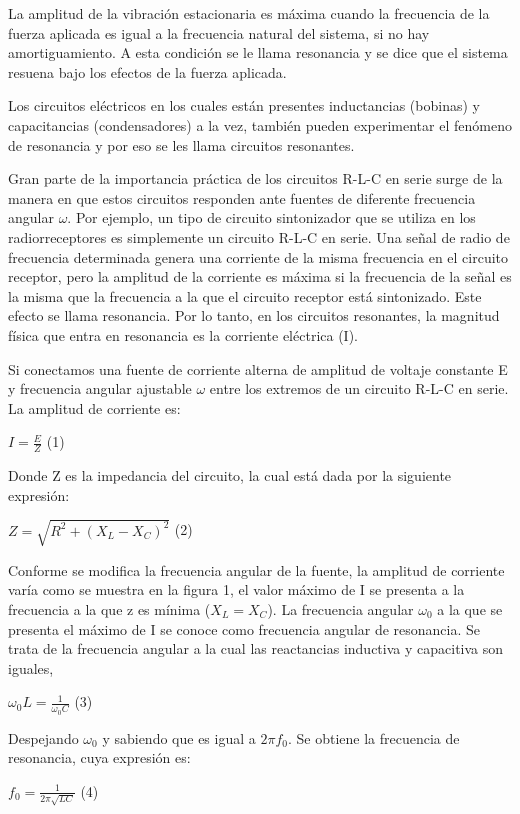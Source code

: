 \documentclass[11pt,a4paper]{article}
\begin{document}
La amplitud de la vibración estacionaria es máxima cuando la frecuencia de la fuerza aplicada es igual a la frecuencia natural del sistema, si no hay amortiguamiento. A esta condición se le llama resonancia y se dice que el sistema resuena bajo los efectos de la fuerza aplicada.

Los circuitos eléctricos en los cuales están presentes inductancias (bobinas) y capacitancias (condensadores) a la vez, también pueden experimentar el fenómeno de resonancia y por eso se les llama circuitos resonantes.

Gran parte de la importancia práctica de los circuitos R-L-C en serie surge de la manera en que estos circuitos responden ante fuentes de diferente frecuencia angular $\omega$. Por ejemplo, un tipo de circuito sintonizador que se utiliza en los radiorreceptores es simplemente un circuito R-L-C en serie. Una señal de radio de frecuencia determinada genera una corriente de la misma frecuencia en el circuito receptor, pero la amplitud de la corriente es máxima si la frecuencia de la señal es la misma que la frecuencia a la que el circuito receptor está sintonizado. Este efecto se llama resonancia. Por lo tanto, en los circuitos resonantes, la magnitud física que entra en resonancia es la corriente eléctrica (I).

Si conectamos una fuente de corriente alterna de amplitud de voltaje constante E y frecuencia angular ajustable $\omega$ entre los extremos de un circuito R-L-C en serie. La amplitud de corriente es:

$I = \frac{E}{Z}$ (1)

Donde Z es la impedancia del circuito, la cual está dada por la siguiente expresión:

$Z = \sqrt{R^2 + (X_L - X_C)^2}$ (2)

Conforme se modifica la frecuencia angular de la fuente, la amplitud de corriente varía como se muestra en la figura 1, el valor máximo de I se presenta a la frecuencia a la que z es mínima ($X_L = X_C$). La frecuencia angular $\omega_0$ a la que se presenta el máximo de I se conoce como frecuencia angular de resonancia. Se trata de la frecuencia angular a la cual las reactancias inductiva y capacitiva son iguales,

$\omega_0 L = \frac{1}{\omega_0 C}$ (3)

Despejando $\omega_0$ y sabiendo que es igual a $2\pi f_0$. Se obtiene la frecuencia de resonancia, cuya expresión es:

$f_0 = \frac{1}{2\pi\sqrt{LC}}$ (4)
\end{document}
